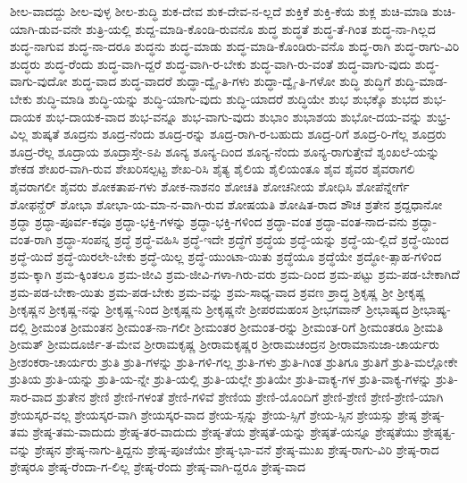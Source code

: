 {ಶೀಲ-ವಾದದ್ದು
ಶೀಲ-ವುಳ್ಳ
ಶೀಲ-ಶುದ್ಧಿ
ಶುಕ-ದೇವ
ಶುಕ-ದೇವ-ನ-ಲ್ಲದೆ
ಶುಕ್ತಿಕೆ
ಶುಕ್ತಿ-ಕೆಯ
ಶುಕ್ಲ
ಶುಚಿ-ಮಾಡಿ
ಶುಚಿ-ಯಾಗಿ-ಡುವ-ವನೇ
ಶುತ್ರಿ-ಯಲ್ಲಿ
ಶುದ್ದ-ಮಾಡಿ-ಕೊಂಡಿ-ರುವನೊ
ಶುದ್ಧ
ಶುದ್ಧತೆ
ಶುದ್ಧ-ತೆ-ಗಿಂತ
ಶುದ್ಧ-ನಾ-ಗಿಲ್ಲದ
ಶುದ್ಧ-ನಾಗುವ
ಶುದ್ಧ-ನಾ-ದರೂ
ಶುದ್ಧನು
ಶುದ್ಧ-ಮಾಡು
ಶುದ್ಧ-ಮಾಡಿ-ಕೊಂಡಿರು-ವನೊ
ಶುದ್ಧ-ರಾಗಿ
ಶುದ್ಧ-ರಾಗು-ವಿರಿ
ಶುದ್ಧರು
ಶುದ್ಧ-ರೆಂದು
ಶುದ್ಧ-ವಾಗಿ-ದ್ದರೆ
ಶುದ್ಧ-ವಾಗಿ-ರ-ಬೇಕು
ಶುದ್ಧ-ವಾಗಿ-ರು-ವಂತೆ
ಶುದ್ಧ-ವಾಗು-ವುದು
ಶುದ್ಧ-ವಾಗು-ವುದೋ
ಶುದ್ಧ-ವಾದ
ಶುದ್ಧ-ವಾದರೆ
ಶುದ್ಧಾ-ದ್ವೈ-ತಿ-ಗಳು
ಶುದ್ಧಾ-ದ್ವೈ-ತಿ-ಗಳೋ
ಶುದ್ಧಿ
ಶುದ್ಧಿಗೆ
ಶುದ್ಧಿ-ಮಾಡ-ಬೇಕು
ಶುದ್ಧಿ-ಮಾಡಿ
ಶುದ್ಧಿ-ಯನ್ನು
ಶುದ್ಧಿ-ಯಾಗು-ವುದು
ಶುದ್ಧಿ-ಯಾದರೆ
ಶುದ್ಧಿಯೇ
ಶುಭ
ಶುಭಕ್ಕೊ
ಶುಭದ
ಶುಭ-ದಾಯಕ
ಶುಭ-ದಾಯಕ-ವಾದ
ಶುಭ-ವನ್ನೂ
ಶುಭ-ವಾಗು-ವುದು
ಶುಭಾಂ
ಶುಭಾಶಯ
ಶುಭೋ-ದಯ-ವನ್ನು
ಶುಭ್ರ-ವಿಲ್ಲ
ಶುಷ್ಕತೆ
ಶೂದ್ರನು
ಶೂದ್ರ-ನೆಂದು
ಶೂದ್ರ-ರನ್ನು
ಶೂದ್ರ-ರಾಗಿ-ರ-ಬಹುದು
ಶೂದ್ರ-ರಿಗೆ
ಶೂದ್ರ-ರಿ-ಗೆಲ್ಲ
ಶೂದ್ರರು
ಶೂದ್ರ-ರೆಲ್ಲ
ಶೂದ್ರಾಯ
ಶೂದ್ರಾಸ್ತೇ-ಽಪಿ
ಶೂನ್ಯ
ಶೂನ್ಯ-ದಿಂದ
ಶೂನ್ಯ-ನೆಂದು
ಶೂನ್ಯ-ರಾಗುತ್ತೇವೆ
ಶೃಂಖಲೆ-ಯನ್ನು
ಶೇಕಡ
ಶೇಖರ-ವಾಗಿ-ರುವ
ಶೇಖರಿಸಲ್ಪಟ್ಟ
ಶೇಖ-ರಿಸಿ
ಶೈತ್ಯ
ಶೈಲಿಯ
ಶೈಲಿಯಂತೂ
ಶೈವ
ಶೈವರ
ಶೈವರಾಗಲಿ
ಶೈವರಾಗಲೀ
ಶೈವರು
ಶೋಕತಾಪ-ಗಳು
ಶೋಕ-ನಾಶನಂ
ಶೋಚತಿ
ಶೋಚನೀಯ
ಶೋಧಿಸಿ
ಶೋಪೆನ್ನೇರ್ಗೆ
ಶೋಫನ್ಹೆರ್
ಶೋಭಾ
ಶೋಭಾ-ಯ-ಮಾ-ನ-ವಾಗಿ-ರುವ
ಶೋಷಯತಿ
ಶೋಷಿತ-ರಾದ
ಶೌಚ
ಶ್ರತೇನ
ಶ್ರದ್ದಧಾನೋ
ಶ್ರದ್ಧಾ
ಶ್ರದ್ಧಾ-ಪೂರ್ವ-ಕವೂ
ಶ್ರದ್ಧಾ-ಭಕ್ತಿ-ಗಳನ್ನು
ಶ್ರದ್ಧಾ-ಭಕ್ತಿ-ಗಳಿಂದ
ಶ್ರದ್ಧಾ-ವಂತ
ಶ್ರದ್ಧಾ-ವಂತ-ನಾದ-ವನು
ಶ್ರದ್ಧಾ-ವಂತ-ರಾಗಿ
ಶ್ರದ್ಧಾ-ಸಂಪನ್ನ
ಶ್ರದ್ಧೆ
ಶ್ರದ್ಧೆ-ವಹಿಸಿ
ಶ್ರದ್ಧೆ-ಇದೇ
ಶ್ರದ್ಧೆಗೆ
ಶ್ರದ್ಧೆಯ
ಶ್ರದ್ಧೆ-ಯನ್ನು
ಶ್ರದ್ಧೆ-ಯ-ಲ್ಲಿದೆ
ಶ್ರದ್ಧೆ-ಯಿಂದ
ಶ್ರದ್ಧೆ-ಯಿದೆ
ಶ್ರದ್ಧೆ-ಯಿರಲೇ-ಬೇಕು
ಶ್ರದ್ಧೆ-ಯಿಲ್ಲ
ಶ್ರದ್ಧೆ-ಯುಂಟಾ-ಯಿತು
ಶ್ರದ್ಧೆಯೂ
ಶ್ರದ್ಧೆಯೇ
ಶ್ರದ್ಧೋ-ತ್ಸಾಹ-ಗಳಿಂದ
ಶ್ರಮ-ಕ್ಕಾಗಿ
ಶ್ರಮ-ಕ್ಕಿಂತಲೂ
ಶ್ರಮ-ಜೀವಿ
ಶ್ರಮ-ಜೀವಿ-ಗಳಾ-ಗಿರು-ವರು
ಶ್ರಮ-ದಿಂದ
ಶ್ರಮ-ಪಟ್ಟು
ಶ್ರಮ-ಪಡ-ಬೇಕಾಗಿದೆ
ಶ್ರಮ-ಪಡ-ಬೇಕಾ-ಯಿತು
ಶ್ರಮ-ಪಡ-ಬೇಕು
ಶ್ರಮ-ವನ್ನು
ಶ್ರಮ-ಸಾಧ್ಯ-ವಾದ
ಶ್ರವಣ
ಶ್ರಾದ್ಧ
ಶ್ರಿಕೃಷ್ಣ
ಶ್ರೀ
ಶ್ರೀಕೃಷ್ಣ
ಶ್ರೀಕೃಷ್ಣನ
ಶ್ರೀಕೃಷ್ಣ-ನನ್ನು
ಶ್ರೀಕೃಷ್ಣ-ನಿಂದ
ಶ್ರೀಕೃಷ್ಣನು
ಶ್ರೀಕೃಷ್ಣನೇ
ಶ್ರೀಪರಮಹಂಸ
ಶ್ರೀಭಗವಾನ್
ಶ್ರೀಭಾಷ್ಯದ
ಶ್ರೀಭಾಷ್ಯ-ದಲ್ಲಿ
ಶ್ರೀಮಂತ
ಶ್ರೀಮಂತನ
ಶ್ರೀಮಂತ-ನಾ-ಗಲೀ
ಶ್ರೀಮಂತರ
ಶ್ರೀಮಂತ-ರನ್ನು
ಶ್ರೀಮಂತ-ರಿಗೆ
ಶ್ರೀಮಂತರೂ
ಶ್ರೀಮತಿ
ಶ್ರೀಮತ್
ಶ್ರೀಮದೂರ್ಜಿ-ತ-ಮೇವ
ಶ್ರೀರಾಮಕೃಷ್ಣ
ಶ್ರೀರಾಮಕೃಷ್ಣರ
ಶ್ರೀರಾಮಚಂದ್ರನ
ಶ್ರೀರಾಮಾನುಜಾ-ಚಾರ್ಯರು
ಶ್ರೀಶಂಕರಾ-ಚಾರ್ಯರು
ಶ್ರುತಿ
ಶ್ರುತಿ-ಗಳನ್ನು
ಶ್ರುತಿ-ಗಳಿ-ಗಲ್ಲ
ಶ್ರುತಿ-ಗಳು
ಶ್ರುತಿ-ಗಿಂತ
ಶ್ರುತಿಗೂ
ಶ್ರುತಿಗೆ
ಶ್ರುತಿ-ಮಲ್ಲೋಕೇ
ಶ್ರುತಿಯ
ಶ್ರುತಿ-ಯನ್ನು
ಶ್ರುತಿ-ಯ-ನ್ನೇ
ಶ್ರುತಿ-ಯಲ್ಲಿ
ಶ್ರುತಿ-ಯಲ್ಲೇ
ಶ್ರುತಿಯೇ
ಶ್ರುತಿ-ವಾಕ್ಯ-ಗಳ
ಶ್ರುತಿ-ವಾಕ್ಯ-ಗಳನ್ನು
ಶ್ರುತಿ-ಸಾರ-ವಾದ
ಶ್ರುತೇನ
ಶ್ರೇಣಿ
ಶ್ರೇಣಿ-ಗಳಂತೆ
ಶ್ರೇಣಿ-ಗಳಿವೆ
ಶ್ರೇಣಿಯ
ಶ್ರೇಣಿ-ಯೊಂದಿಗೆ
ಶ್ರೇಣಿ-ಶ್ರೇಣಿ
ಶ್ರೇಣಿ-ಶ್ರೇಣಿ-ಯಾಗಿ
ಶ್ರೇಯಸ್ಕರ-ವಲ್ಲ
ಶ್ರೇಯಸ್ಕರ-ವಾಗಿ
ಶ್ರೇಯಸ್ಕರ-ವಾದ
ಶ್ರೇಯ-ಸ್ಸನ್ನು
ಶ್ರೇಯ-ಸ್ಸಿಗೆ
ಶ್ರೇಯ-ಸ್ಸಿನ
ಶ್ರೇಯಸ್ಸು
ಶ್ರೇಷ್ಠ
ಶ್ರೇಷ್ಠ-ತಮ
ಶ್ರೇಷ್ಠ-ತಮ-ವಾದುದು
ಶ್ರೇಷ್ಠ-ತರ-ವಾದುದು
ಶ್ರೇಷ್ಠ-ತೆಯ
ಶ್ರೇಷ್ಠತೆ-ಯನ್ನು
ಶ್ರೇಷ್ಠತೆ-ಯನ್ನೂ
ಶ್ರೇಷ್ಠತೆಯು
ಶ್ರೇಷ್ಠತ್ವ-ವನ್ನು
ಶ್ರೇಷ್ಠನ
ಶ್ರೇಷ್ಠ-ನಾಗು-ತ್ತಿದ್ದನು
ಶ್ರೇಷ್ಠ-ಪೂಜೆಯೇ
ಶ್ರೇಷ್ಠ-ಭಾ-ವನೆ
ಶ್ರೇಷ್ಠ-ಮುಖ
ಶ್ರೇಷ್ಠ-ರಾಗು-ವಿರಿ
ಶ್ರೇಷ್ಠ-ರಾದ
ಶ್ರೇಷ್ಠರೂ
ಶ್ರೇಷ್ಠ-ರೆಂದಾ-ಗ-ಲಿಲ್ಲ
ಶ್ರೇಷ್ಠ-ರೆಂದು
ಶ್ರೇಷ್ಠ-ವಾಗಿ-ದ್ದರೂ
ಶ್ರೇಷ್ಠ-ವಾದ
}
